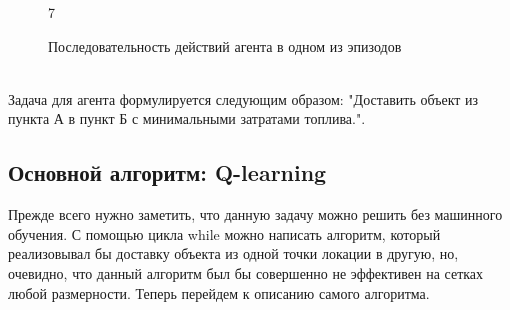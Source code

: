 \documentclass[a4paper]{report}
\theoremstyle{definition}
\theoremstyle{plain}
\theoremstyle{remark}
\theoremstyle{remark}
\theoremstyle{definition}
\begin{document}
\begin{figure}[H]
\begin{minipage}[H]{0.24\linewidth}
    \end{minipage}
    \begin{minipage}[H]{0.24\linewidth}
         7\\
    \end{minipage}
    \caption{Последовательность действий агента в одном из эпизодов}
    \label{fig:my_label}
\end{figure}
\\
Задача для агента формулируется следующим образом: "Доставить объект из пункта А в пункт Б с минимальными затратами топлива.".
\begin{center}
    \subsection{Основной алгоритм: Q-learning}
\end{center}

Прежде всего нужно заметить, что данную задачу можно решить без машинного обучения. С помощью цикла while можно написать алгоритм, который реализовывал бы доставку объекта из одной точки локации в другую, но, очевидно, что данный алгоритм был бы совершенно не эффективен на сетках любой размерности. Теперь перейдем к описанию самого алгоритма. 
\end{document}

